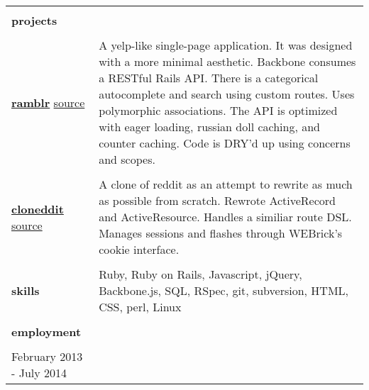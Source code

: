\documentclass{article}
\begin{document}
\begin{tabular}{L{2.5cm} R{14cm}}
    
    \hline \\

    \large{\textbf{projects}} \\\\
    \normalsize
    
    \href{http://www.ramblr.co}{\large{\textbf{ramblr}}}
    \normalsize
    \newline
    \href{https://github.com/kellyjospehprice/ramblr}{source}
    
    &
    
    A yelp-like single-page application. It was designed with a more
    minimal aesthetic. Backbone consumes a RESTful Rails API. There is a categorical
    autocomplete and search using custom routes. Uses polymorphic associations. 
    The API is optimized with eager loading, russian doll caching, and counter
    caching. Code is DRY'd up using concerns and scopes.

    \\\\
    
    \href{http://klog.io/cloneddit}{\large{\textbf{cloneddit}}}
    \normalsize
    \newline
    \href{https://github.com/kellyjospehprice/cloneddit}{source}
    
    &
    
    A clone of reddit as an attempt to rewrite as much as possible from
    scratch. Rewrote ActiveRecord and ActiveResource. Handles a similiar route
    DSL. Manages sessions and flashes through WEBrick's cookie interface.

    \\ \hline \\

    \large{\textbf{skills}}
    \normalsize

    &

    Ruby, Ruby on Rails, Javascript, jQuery, Backbone.js, SQL, RSpec, git, 
    subversion, HTML, CSS, perl, Linux

    \\ \hline \\

    \large{\textbf{employment}} \\\\
    \normalsize

    February 2013 - July 2014
    

\end{tabular}
\end{document}
